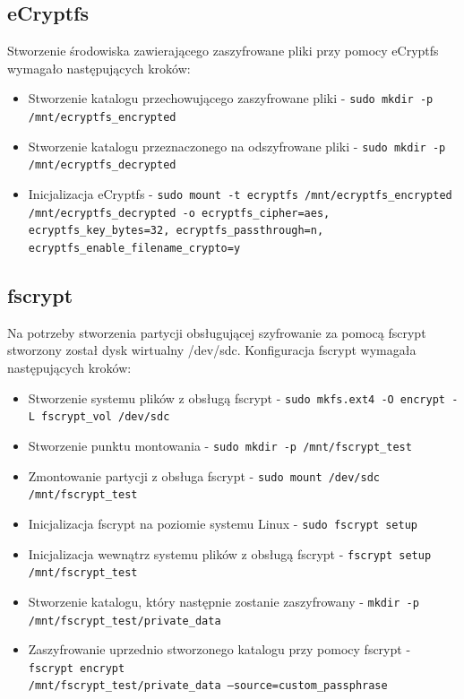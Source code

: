\documentclass[a4paper]{article}
\begin{document}
\subsection{eCryptfs}
Stworzenie środowiska zawierającego zaszyfrowane pliki przy pomocy eCryptfs wymagało następujących
kroków:
\begin{itemize}
    \item Stworzenie katalogu przechowującego zaszyfrowane pliki - \texttt{sudo mkdir -p
    /mnt/ecryptfs\_encrypted}
    \item Stworzenie katalogu przeznaczonego na odszyfrowane pliki - \texttt{sudo mkdir -p
    /mnt/ecryptfs\_decrypted}
    \item Inicjalizacja eCryptfs - \texttt{sudo mount -t ecryptfs /mnt/ecryptfs\_encrypted
    /mnt/ecryptfs\_decrypted -o ecryptfs\_cipher=aes, ecryptfs\_key\_bytes=32,
    ecryptfs\_passthrough=n, \\ecryptfs\_enable\_filename\_crypto=y}
\end{itemize}

\subsection{fscrypt}
Na potrzeby stworzenia partycji obsługującej szyfrowanie za pomocą fscrypt stworzony został
dysk wirtualny /dev/sdc. Konfiguracja fscrypt wymagała następujących kroków:
\begin{itemize}
    \item Stworzenie systemu plików z obsługą fscrypt - \texttt{sudo mkfs.ext4 -O encrypt -L
    fscrypt\_vol /dev/sdc}
    \item Stworzenie punktu montowania - \texttt{sudo mkdir -p /mnt/fscrypt\_test}
    \item Zmontowanie partycji z obsługa fscrypt - \texttt{sudo mount /dev/sdc /mnt/fscrypt\_test}
    \item Inicjalizacja fscrypt na poziomie systemu Linux - \texttt{sudo fscrypt setup}
    \item Inicjalizacja wewnątrz systemu plików z obsługą fscrypt - \texttt{fscrypt setup
    /mnt/fscrypt\_test}
    \item Stworzenie katalogu, który następnie zostanie zaszyfrowany - \texttt{mkdir -p
    /mnt/fscrypt\_test/private\_data}
    \item Zaszyfrowanie uprzednio stworzonego katalogu przy pomocy fscrypt - \texttt{fscrypt
    encrypt \\
    /mnt/fscrypt\_test/private\_data --source=custom\_passphrase}
\end{itemize}
\end{document}
